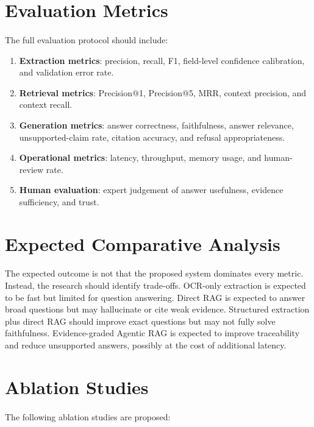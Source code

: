 \section{Evaluation Metrics}
\paragraph{} The full evaluation protocol should include:

\begin{enumerate}
    \item \textbf{Extraction metrics}: precision, recall, F1, field-level confidence calibration, and validation error rate.
    \item \textbf{Retrieval metrics}: Precision@1, Precision@5, MRR, context precision, and context recall.
    \item \textbf{Generation metrics}: answer correctness, faithfulness, answer relevance, unsupported-claim rate, citation accuracy, and refusal appropriateness.
    \item \textbf{Operational metrics}: latency, throughput, memory usage, and human-review rate.
    \item \textbf{Human evaluation}: expert judgement of answer usefulness, evidence sufficiency, and trust.
\end{enumerate}

\section{Expected Comparative Analysis}
\paragraph{} The expected outcome is not that the proposed system dominates every metric. Instead, the research should identify trade-offs. OCR-only extraction is expected to be fast but limited for question answering. Direct RAG is expected to answer broad questions but may hallucinate or cite weak evidence. Structured extraction plus direct RAG should improve exact questions but may not fully solve faithfulness. Evidence-graded Agentic RAG is expected to improve traceability and reduce unsupported answers, possibly at the cost of additional latency.

\section{Ablation Studies}
\paragraph{} The following ablation studies are proposed:

